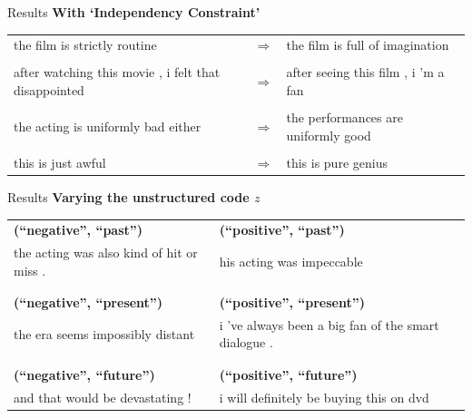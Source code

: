 \documentclass{beamer}
\begin{document}
\begin{frame}{Results}
	\centering
	{\large \textbf{With `Independency Constraint'}} \\
	\vspace{1cm}
	\small
	\begin{tabular}{ p{.4\linewidth} p{.05\linewidth} p{.4\linewidth} }
		the film is strictly routine                         & $\Rightarrow$ & the film is full of imagination     \\  \\
		after watching this movie , i felt that disappointed & $\Rightarrow$ & after seeing this film , i 'm a fan \\  \\
		the acting is uniformly bad either                   & $\Rightarrow$ & the performances are uniformly good \\  \\
		this is just awful                                   & $\Rightarrow$ & this is pure genius
	\end{tabular}
\end{frame}

\begin{frame}{Results}
	\centering
	{\large \textbf{Varying the unstructured code $z$}} \\
	\vspace{0.75cm}
	\small
	\begin{tabular}{ p{.43\linewidth} | p{.43\linewidth} }
		{\bf (``negative'', ``past'')}            & {\bf (``positive'', ``past'')}                      \\
		the acting was also kind of hit or miss . & his acting was impeccable                           \\
		\\ \hline \\
		{\bf (``negative'', ``present'')}         & {\bf (``positive'', ``present'')}                   \\
		the era seems impossibly distant          & i 've always been a big fan of the smart dialogue . \\
		\\ \hline \\
		{\bf (``negative'', ``future'')}          & {\bf (``positive'', ``future'')}                    \\
		and that would be devastating !           & i will definitely be buying this on dvd             \\
	\end{tabular}
\end{frame}
\end{document}
